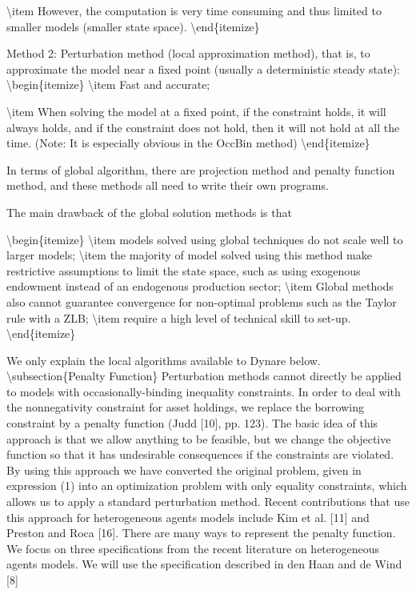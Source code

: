 \documentclass[10pt,math=newtx,citestyle=gb7714-2015,bibstyle=gb7714-2015]{elegantbook}
\begin{document}
	\textbackslash{}item However, the computation is very time consuming and thus limited to smaller models (smaller state space).
	\textbackslash{}end\{itemize\}
	
	Method 2: Perturbation method (local approximation method), that is, to approximate the model near a fixed point (usually a deterministic steady state):
	\textbackslash{}begin\{itemize\}
	\textbackslash{}item Fast and accurate;
	
	\textbackslash{}item When solving the model at a fixed point, if the constraint holds, it will always holds, and if the constraint does not hold, then it will not hold at all the time. (Note: It is especially obvious in the OccBin method)
	\textbackslash{}end\{itemize\}
	
	
	In terms of global algorithm, there are projection method and penalty function method, and these methods all need to write their own programs.
	
	The main drawback of the global solution methods is that
	
	\textbackslash{}begin\{itemize\}
	\textbackslash{}item models solved using global techniques do not scale well to larger models;
	\textbackslash{}item the majority of model solved using this method make restrictive assumptions to limit the state space, such as using exogenous endowment instead of an endogenous production sector;
	\textbackslash{}item Global methods also cannot guarantee convergence for non-optimal problems such as the Taylor rule with a ZLB;
	\textbackslash{}item require a high level of technical skill to set-up.
	\textbackslash{}end\{itemize\}
	
	
	We only explain the local algorithms available to Dynare below.
	\textbackslash{}subsection\{Penalty Function\}
	Perturbation methods cannot directly be applied to models
	with occasionally-binding inequality constraints. In order to deal with the nonnegativity
	constraint for asset holdings, we replace the borrowing constraint by a
	penalty function (Judd [10], pp. 123). The basic idea of this approach is that we
	allow anything to be feasible, but we change the objective function so that it has
	undesirable consequences if the constraints are violated. By using this approach
	we have converted the original problem, given in expression (1) into an optimization
	problem with only equality constraints, which allows us to apply a standard
	perturbation method. Recent contributions that use this approach for heterogeneous
	agents models include Kim et al. [11] and Preston and Roca [16]. There are
	many ways to represent the penalty function. We focus on three specifications from
	the recent literature on heterogeneous agents models. We will use the specification
	described in den Haan and de Wind [8]
	
\end{document}
